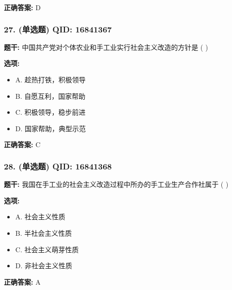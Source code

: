 \documentclass[12pt,UTF8]{ctexart}
\begin{document}
\textbf{正确答案:}
D

\vspace{0.3em}\hrulefill\vspace{0.7em}

\subsubsection*{27. (单选题) \small QID: 16841367}

\textbf{题干:}
中国共产党对个体农业和手工业实行社会主义改造的方针是 ( )

\textbf{选项:}
\begin{itemize}[leftmargin=*]

  \item A. 趁热打铁，积极领导

  \item B. 自愿互利，国家帮助

  \item C. 积极领导，稳步前进

  \item D. 国家帮助，典型示范

\end{itemize}

\textbf{正确答案:}
C

\vspace{0.3em}\hrulefill\vspace{0.7em}

\subsubsection*{28. (单选题) \small QID: 16841368}

\textbf{题干:}
我国在手工业的社会主义改造过程中所办的手工业生产合作社属于 ( )

\textbf{选项:}
\begin{itemize}[leftmargin=*]

  \item A. 社会主义性质

  \item B. 半社会主义性质

  \item C. 社会主义萌芽性质

  \item D. 非社会主义性质

\end{itemize}

\textbf{正确答案:}
A

\vspace{0.3em}\hrulefill\vspace{0.7em}
\end{document}
